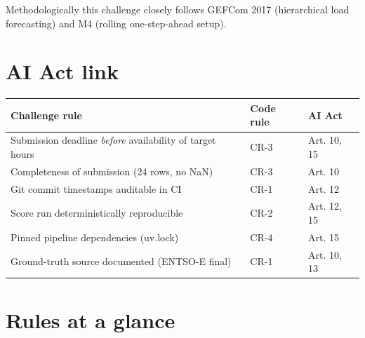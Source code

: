 \documentclass[
  english,
  letterpaper,
]{scrbook}
\newcounter{none} %
\begin{document}
Methodologically this challenge closely follows GEFCom 2017
(hierarchical load forecasting) and M4 (rolling one-step-ahead setup).

\section{AI Act link}\label{ai-act-link-7}

{\def\LTcaptype{none} %
\begin{longtable}[]{@{}
  >{\raggedright\arraybackslash}p{}
  >{\raggedright\arraybackslash}p{}
  >{\raggedright\arraybackslash}p{}@{}}
\toprule\noalign{}
\begin{minipage}[b]{\linewidth}\raggedright
Challenge rule
\end{minipage} & \begin{minipage}[b]{\linewidth}\raggedright
Code rule
\end{minipage} & \begin{minipage}[b]{\linewidth}\raggedright
AI Act
\end{minipage} \\
\midrule\noalign{}
\endhead
\bottomrule\noalign{}
\endlastfoot
Submission deadline \emph{before} availability of target hours & CR-3 &
Art. 10, 15 \\
Completeness of submission (24 rows, no NaN) & CR-3 & Art. 10 \\
Git commit timestamps auditable in CI & CR-1 & Art. 12 \\
Score run deterministically reproducible & CR-2 & Art. 12, 15 \\
Pinned pipeline dependencies (uv.lock) & CR-4 & Art. 15 \\
Ground-truth source documented (ENTSO-E final) & CR-1 & Art. 10, 13 \\
\end{longtable}
}

\section{Rules at a glance}\label{rules-at-a-glance}
\end{document}
